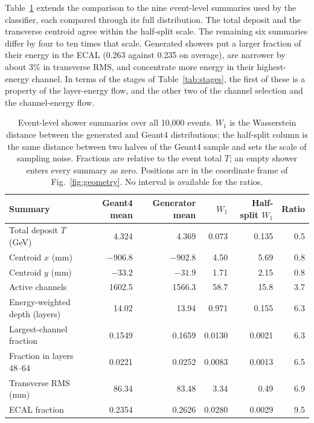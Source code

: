 \documentclass[11pt]{article}
\begin{document}
Table~\ref{tab:distances} extends the comparison to the nine event-level summaries used by the classifier, each compared through its full distribution. The total deposit and the transverse centroid agree within the half-split scale. The remaining six summaries differ by four to ten times that scale. Generated showers put a larger fraction of their energy in the ECAL (0.263 against 0.235 on average), are narrower by about 3\% in transverse RMS, and concentrate more energy in their highest-energy channel. In terms of the stages of Table~\ref{tab:stages}, the first of these is a property of the layer-energy flow, and the other two of the channel selection and the channel-energy flow.

\begin{table}[!htbp]
\centering
\caption{Event-level shower summaries over all 10,000 events. $W_1$ is the Wasserstein distance between the generated and Geant4 distributions; the half-split column is the same distance between two halves of the Geant4 sample and sets the scale of sampling noise. Fractions are relative to the event total $T$; an empty shower enters every summary as zero. Positions are in the coordinate frame of Fig.~\ref{fig:geometry}. No interval is available for the ratios.}
\label{tab:distances}
\small
\begin{tabular}{@{}lrrrrr@{}}
\toprule
Summary & Geant4 mean & Generator mean & $W_1$ & Half-split $W_1$ & Ratio \\
\midrule
Total deposit $T$ (GeV) & 4.324 & 4.369 & 0.073 & 0.135 & 0.5 \\
Centroid $x$ (mm) & $-906.8$ & $-902.8$ & 4.50 & 5.69 & 0.8 \\
Centroid $y$ (mm) & $-33.2$ & $-31.9$ & 1.71 & 2.15 & 0.8 \\
\midrule
Active channels & 1602.5 & 1566.3 & 58.7 & 15.8 & 3.7 \\
Energy-weighted depth (layers) & 14.02 & 13.94 & 0.971 & 0.155 & 6.3 \\
Largest-channel fraction & 0.1549 & 0.1659 & 0.0130 & 0.0021 & 6.3 \\
Fraction in layers 48--64 & 0.0221 & 0.0252 & 0.0083 & 0.0013 & 6.5 \\
Transverse RMS (mm) & 86.34 & 83.48 & 3.34 & 0.49 & 6.9 \\
ECAL fraction & 0.2354 & 0.2626 & 0.0280 & 0.0029 & 9.5 \\
\bottomrule
\end{tabular}
\end{table}
\end{document}
